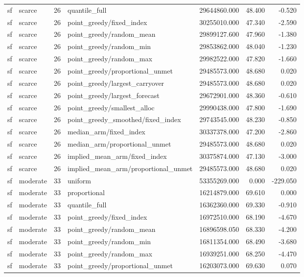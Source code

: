 \begin{tabular}{llrlrrr}
sf & scarce & 26 & quantile\_full & 29644860.000 & 48.400 & -0.520 \\
sf & scarce & 26 & point\_greedy/fixed\_index & 30255010.000 & 47.340 & -2.590 \\
sf & scarce & 26 & point\_greedy/random\_mean & 29899127.600 & 47.960 & -1.380 \\
sf & scarce & 26 & point\_greedy/random\_min & 29853862.000 & 48.040 & -1.230 \\
sf & scarce & 26 & point\_greedy/random\_max & 29982522.000 & 47.820 & -1.660 \\
sf & scarce & 26 & point\_greedy/proportional\_unmet & 29485573.000 & 48.680 & 0.020 \\
sf & scarce & 26 & point\_greedy/largest\_carryover & 29485573.000 & 48.680 & 0.020 \\
sf & scarce & 26 & point\_greedy/largest\_forecast & 29672901.000 & 48.360 & -0.610 \\
sf & scarce & 26 & point\_greedy/smallest\_alloc & 29990438.000 & 47.800 & -1.690 \\
sf & scarce & 26 & point\_greedy\_smoothed/fixed\_index & 29743545.000 & 48.230 & -0.850 \\
sf & scarce & 26 & median\_arm/fixed\_index & 30337378.000 & 47.200 & -2.860 \\
sf & scarce & 26 & median\_arm/proportional\_unmet & 29485573.000 & 48.680 & 0.020 \\
sf & scarce & 26 & implied\_mean\_arm/fixed\_index & 30375874.000 & 47.130 & -3.000 \\
sf & scarce & 26 & implied\_mean\_arm/proportional\_unmet & 29485573.000 & 48.680 & 0.020 \\
sf & moderate & 33 & uniform & 53355269.000 & 0.000 & -229.050 \\
sf & moderate & 33 & proportional & 16214879.000 & 69.610 & 0.000 \\
sf & moderate & 33 & quantile\_full & 16362360.000 & 69.330 & -0.910 \\
sf & moderate & 33 & point\_greedy/fixed\_index & 16972510.000 & 68.190 & -4.670 \\
sf & moderate & 33 & point\_greedy/random\_mean & 16896598.050 & 68.330 & -4.200 \\
sf & moderate & 33 & point\_greedy/random\_min & 16811354.000 & 68.490 & -3.680 \\
sf & moderate & 33 & point\_greedy/random\_max & 16939251.000 & 68.250 & -4.470 \\
sf & moderate & 33 & point\_greedy/proportional\_unmet & 16203073.000 & 69.630 & 0.070 \\

\end{tabular}

